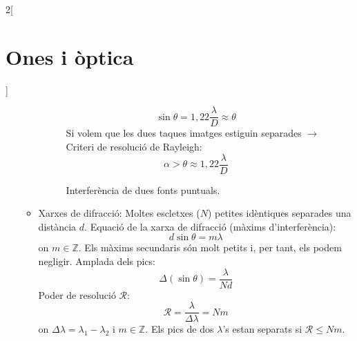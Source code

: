 \documentclass[class=article,10pt,crop=false]{standalone}
\begin{document}
\begin{multicols}{2}[\section{Ones i òptica}]
\begin{itemize}
\begin{itemize}
\begin{figure}[ht]
    \caption{Interferència de dues fonts puntuals.}
    $$\sin\theta=1,22\frac{\lambda}{D}\approx\theta$$
    Si volem que les dues taques imatges estiguin separades $\rightarrow$
    Criteri de resolució de Rayleigh: $$\alpha>\theta\approx1,22\frac{\lambda}{D}$$
\end{figure}
    \item Xarxes de difracció: Moltes escletxes ($N$) petites idèntiques separades una distància $d$.\newline
    Equació de la xarxa de difracció (màxims d'interferència): $$d\sin\theta=m\lambda$$ {\footnotesize on $m\in\mathbb{Z}$.}\newline
    Els màxims secundaris són molt petits i, per tant, els podem ne\-gli\-gir.\newline
    Amplada dels pics: $$\Delta(\sin\theta)=\frac{\lambda}{Nd}$$
    Poder de resolució $\mathcal{R}$: $$\mathcal{R}=\frac{\lambda}{\Delta\lambda}=Nm$$ {\footnotesize on $\Delta\lambda=\lambda_1-\lambda_2$ i $m\in\mathbb{Z}$.}\newline
    Els pics de dos $\lambda$'s estan separats si $\mathcal{R}\leq Nm$.
    \end{itemize}
\end{itemize}
\end{multicols}
\end{document}
